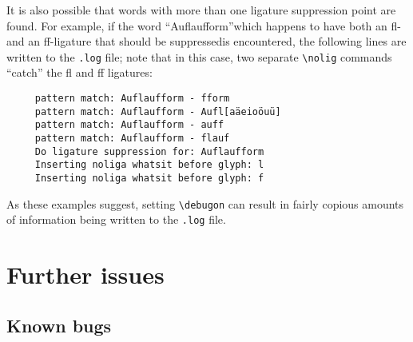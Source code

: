 \documentclass[12pt]{article}
\newcommand{\opt}[1]{\texttt{#1}}
\newcommand{\cmmd}[1]{\texttt{\textbackslash #1}}
\begin{document}
It is also possible that words with more than one ligature suppression point are found. For example, if the word \enquote{Auflaufform}\textemdash which happens to have both an fl- and an ff-ligature that should be suppressed\textemdash is encountered, the following lines are written to the \opt{.log} file; note that in this case, two separate \cmmd{nolig} commands \enquote{catch} the fl and ff ligatures:
\begin{Verbatim}
     pattern match: Auflaufform - fform
     pattern match: Auflaufform - Aufl[aäeioöuü]
     pattern match: Auflaufform - auff
     pattern match: Auflaufform - flauf
     Do ligature suppression for: Auflaufform
     Inserting noliga whatsit before glyph: l
     Inserting noliga whatsit before glyph: f
\end{Verbatim}


As these examples suggest, setting \cmmd{debugon} can result in fairly copious amounts of information being written to the \opt{.log} file.



\section{Further issues}

\subsection{Known bugs}
\end{document}
